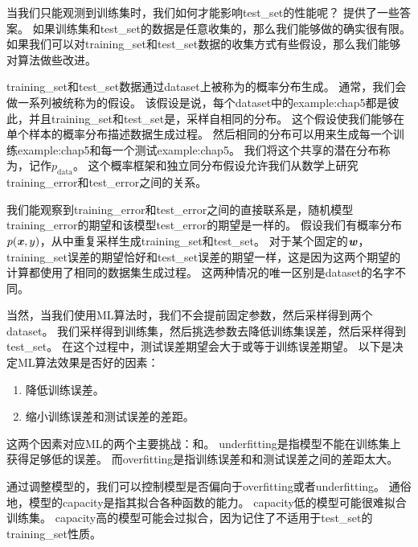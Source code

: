 
当我们只能观测到训练集时，我们如何才能影响\gls{test_set}的性能呢？
提供了一些答案。
如果训练集和\gls{test_set}的数据是任意收集的，那么我们能够做的确实很有限。
如果我们可以对\gls{training_set}和\gls{test_set}数据的收集方式有些假设，那么我们能够对算法做些改进。

\gls{training_set}和\gls{test_set}数据通过\gls{dataset}上被称为的概率分布生成。
通常，我们会做一系列被统称为的假设。
该假设是说，每个\gls{dataset}中的\gls{example:chap5}都是彼此，并且\gls{training_set}和\gls{test_set}是，采样自相同的分布。
这个假设使我们能够在单个样本的概率分布描述数据生成过程。
然后相同的分布可以用来生成每一个训练\gls{example:chap5}和每一个测试\gls{example:chap5}。
我们将这个共享的潜在分布称为，记作$p_{\text{data}}$。
这个概率框架和独立同分布假设允许我们从数学上研究\gls{training_error}和\gls{test_error}之间的关系。

我们能观察到\gls{training_error}和\gls{test_error}之间的直接联系是，随机模型\gls{training_error}的期望和该模型\gls{test_error}的期望是一样的。
假设我们有概率分布$p(\boldsymbol{\mathit{x}},y)$，从中重复采样生成\gls{training_set}和\gls{test_set}。
对于某个固定的$\boldsymbol{\mathit{w}}$，\gls{training_set}误差的期望恰好和\gls{test_set}误差的期望一样，这是因为这两个期望的计算都使用了相同的数据集生成过程。
这两种情况的唯一区别是\gls{dataset}的名字不同。

当然，当我们使用\gls{ML}算法时，我们不会提前固定参数，然后采样得到两个\gls{dataset}。
我们采样得到训练集，然后挑选参数去降低训练集误差，然后采样得到\gls{test_set}。
在这个过程中，测试误差期望会大于或等于训练误差期望。
以下是决定\gls{ML}算法效果是否好的因素：
\begin{enumerate}
    \item 降低训练误差。
    \item 缩小训练误差和测试误差的差距。
\end{enumerate}

这两个因素对应\gls{ML}的两个主要挑战：和。
\gls{underfitting}是指模型不能在训练集上获得足够低的误差。
而\gls{overfitting}是指训练误差和和测试误差之间的差距太大。


通过调整模型的，我们可以控制模型是否偏向于\gls{overfitting}或者\gls{underfitting}。
通俗地，模型的\gls{capacity}是指其拟合各种函数的能力。
\gls{capacity}低的模型可能很难拟合训练集。
\gls{capacity}高的模型可能会过拟合，因为记住了不适用于\gls{test_set}的\gls{training_set}性质。

